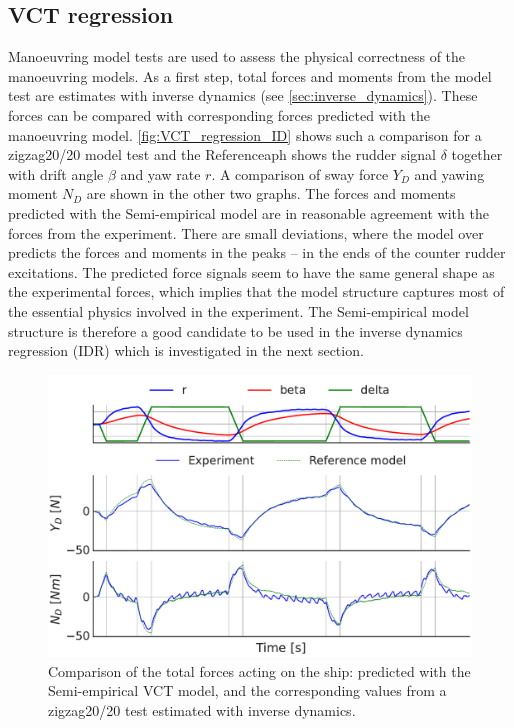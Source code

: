 \subsection{VCT regression}
\label{sec:result_VCT_regression}
Manoeuvring model tests are used to assess the physical correctness of the manoeuvring models. As a first step, total forces and moments from the model test are estimates with inverse dynamics (see \autoref{sec:inverse_dynamics}). These forces can be compared with corresponding forces predicted with the manoeuvring model. 
\autoref{fig:VCT_regression_ID} shows such a comparison for a zigzag20/20 model test and the Referenceaph shows the rudder signal $\delta$ together with drift angle $\beta$ and yaw rate $r$. A comparison of sway force $Y_D$ and yawing moment $N_D$ are shown in the other two graphs. The forces and moments predicted with the Semi-empirical model are in reasonable agreement with the forces from the experiment. There are small deviations, where the model over predicts the forces and moments in the peaks -- in the ends of the counter rudder excitations. The predicted force signals seem to have the same general shape as the experimental forces, which implies that the model structure captures most of the essential physics involved in the experiment. The Semi-empirical model structure is therefore a good candidate to be used in the inverse dynamics regression (IDR) which is investigated in the next section.
\begin{figure}[h!]
    \includegraphics[width=\columnwidth]{figures/result_VCT_regression.VCT_regression_ID.pdf}
    \caption{Comparison of the total forces acting on the ship: predicted with the Semi-empirical VCT model, and the corresponding values from a zigzag20/20 test estimated with inverse dynamics.}
    \label{fig:VCT_regression_ID}
\end{figure}
